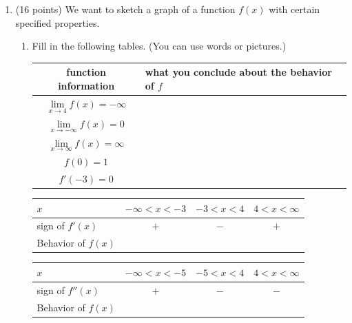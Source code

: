 \documentclass[11pt]{article}
\begin{document}
\begin{enumerate}
\newpage

\item (16 points) We want to sketch a graph of a function $f(x)$ with certain specified properties.

\begin{enumerate}
\item Fill in the following tables. (You can use words or pictures.)

\renewcommand{\arraystretch}{1.8}
\begin{tabular}{| c | l |} \hline
function information & \quad \hspace{1.5cm} what you conclude about the behavior of $f$\hspace{1.5cm} \quad\\ \hline \hline
 $\lim\limits_{x \to 4} f(x) = -\infty$ & \\ \hline
 $\lim\limits_{x \to - \infty} f(x) = 0$  & \\ \hline
 $\lim\limits_{x \to  \infty} f(x) = \infty$  & \\ \hline
 $f(0) =1$ & \\ \hline
 $f'(-3) =  0$ & \\ \hline
\end{tabular}

\bigskip

\begin{small}
\begin{tabular}{| l || c |  c | c | }
\hline
 $x$  &\quad $-\infty< x<-3$\quad \hspace{.08in} \quad &\quad  $-3 < x < 4$ \quad \quad & $4 < x < \infty$  \\ \hline
 sign of $f'(x)$ & $+$  & $-$  & $+$     \\ \hline
Behavior of $f(x)$& &&\\ \hline
  \end{tabular}
  \end{small}
  
  \begin{small}
\begin{tabular}{| l || c | c | c | }\hline
 $x$  & $-\infty< x<-5$ & \quad $-5< x < 4$ \quad  \hspace{.35in} \quad& $4 < x < \infty $ \\ \hline
 sign of $f''(x)$ & $+$ & $-$ & $-$  \\ \hline
Behavior of $f(x)$& &&\\\hline
  \end{tabular}
  \end{small}


\end{enumerate}
\end{enumerate}
\end{document}
